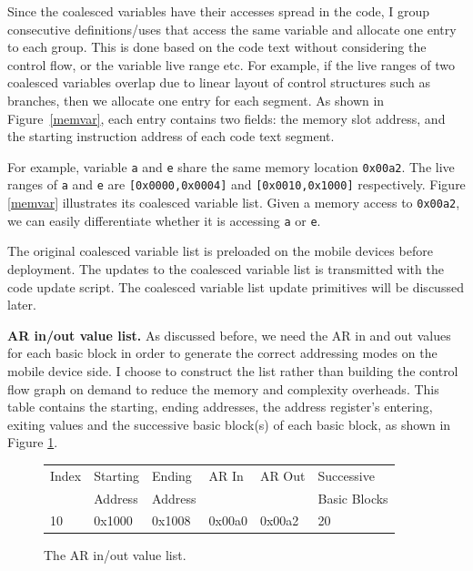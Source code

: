 Since the coalesced variables have their accesses spread in the code, I group consecutive definitions/uses that access 
the same variable and allocate one entry to each group. This is done based on the code text without considering the 
control flow, or the variable live range etc. For example, if the live ranges of two coalesced variables overlap due to 
linear layout of control structures such as branches, then we allocate one entry for each segment. As shown in 
Figure~\ref{memvar}, each entry contains two fields: the memory slot address, and the starting instruction address of 
each code text segment. 

For example, variable {\tt a} and {\tt e} share the same memory location {\tt 0x00a2}. The live ranges of {\tt a} and 
{\tt e} are {\tt [0x0000,0x0004]} and {\tt [0x0010,0x1000]} respectively. Figure \ref{memvar} illustrates its coalesced 
variable list. Given a memory access to {\tt 0x00a2}, we can easily differentiate whether it is accessing {\tt a} or 
{\tt e}.

The original coalesced variable list is preloaded on the mobile devices before deployment. The updates to the coalesced 
variable list is transmitted with the code update script. The coalesced variable list update primitives will be 
discussed later.

{\bf AR in/out value list.} 
As discussed before, we need the AR in and out values for each basic block in order to generate the correct addressing 
modes on the mobile device side. I choose to construct the list rather than building the control flow graph on demand 
to reduce the memory and complexity overheads. This table contains the starting, ending addresses, the address 
register's entering, exiting values and the successive basic block(s) of each basic block, as shown in Figure 
\ref{bbtable}.

\begin{figure}[htdp]

\begin{center}
\begin{small}
\begin{tabular}{p{0.5in}p{1in}p{1in}p{1in}p{1in}p{1in}}
\hline
Index & Starting  & Ending  & AR In & AR Out & Successive \\
&Address&Address & & &Basic Blocks\\
\hline\hline
10 & 0x1000 & 0x1008 & 0x00a0 & 0x00a2 & 20\\ \hline
\end{tabular}
\end{small}
\end{center}
\caption{The AR in/out value list.}
\label{bbtable}
\end{figure}%

